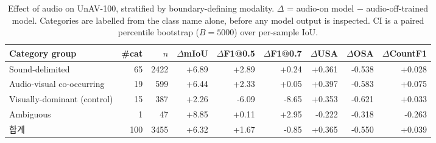 \begin{table}[t]
\centering\small
\caption{Effect of audio on UnAV-100, stratified by boundary-defining modality. $\Delta$ = audio-on model $-$ audio-off-trained model. Categories are labelled from the class name alone, before any model output is inspected. CI is a paired percentile bootstrap ($B=5000$) over per-sample IoU.}
\label{tab:audio_delta_modality}
\begin{tabular}{lrrrrrrrr}
\toprule
Category group & \#cat & $n$ & $\Delta$mIoU & $\Delta$F1@0.5 & $\Delta$F1@0.7 & $\Delta$USA & $\Delta$OSA & $\Delta$CountF1 \\
\midrule
Sound-delimited & 65 & 2422 & +6.89 & +2.89 & +0.24 & +0.361 & -0.538 & +0.028 \\
Audio-visual co-occurring & 19 & 599 & +6.44 & +2.33 & +0.05 & +0.397 & -0.583 & +0.075 \\
Visually-dominant (control) & 15 & 387 & +2.26 & -6.09 & -8.65 & +0.353 & -0.621 & +0.033 \\
Ambiguous & 1 & 47 & +8.85 & +0.11 & +2.95 & -0.222 & -0.318 & -0.263 \\
\midrule
합계 & 100 & 3455 & +6.32 & +1.67 & -0.85 & +0.365 & -0.550 & +0.039 \\
\bottomrule
\end{tabular}
\end{table}
